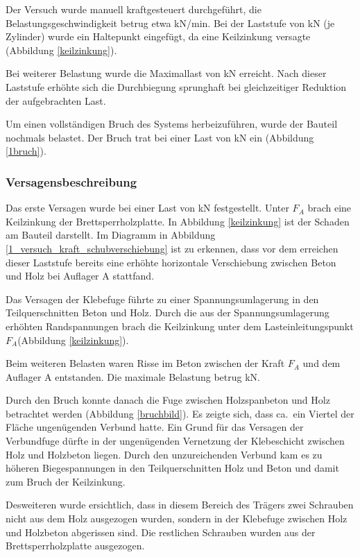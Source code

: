 Der Versuch wurde manuell kraftgesteuert durchgeführt, die Belastungsgeschwindigkeit betrug etwa \unit[4]{kN/min}. Bei der Laststufe von \unit[58]{kN} (je Zylinder) wurde ein Haltepunkt eingefügt, da eine Keilzinkung versagte (Abbildung \ref{keilzinkung}). 

Bei weiterer Belastung wurde die Maximallast von \unit[78]{kN} erreicht. Nach dieser Laststufe erhöhte sich die Durchbiegung sprunghaft bei gleichzeitiger Reduktion der aufgebrachten Last.

Um einen vollständigen Bruch des Systems herbeizuführen, wurde der Bauteil nochmals belastet. Der Bruch trat bei einer Last von \unit[48]{kN} ein (Abbildung \ref{1bruch}).

\subsubsection{Versagensbeschreibung}

Das erste Versagen wurde bei einer Last von \unit[58]{kN} festgestellt. Unter $F_{A}$ brach eine Keilzinkung der Brettsperrholzplatte. In Abbildung \ref{keilzinkung} ist der Schaden am Bauteil darstellt. Im Diagramm in Abbildung \ref{1_versuch_kraft_schubverschiebung} ist zu erkennen, dass vor dem erreichen dieser Laststufe bereits eine erhöhte horizontale Verschiebung zwischen Beton und Holz bei Auflager A stattfand. 

Das Versagen der Klebefuge führte zu einer Spannungsumlagerung in den Teilquerschnitten Beton und Holz. 
Durch die aus der Spannungsumlagerung erhöhten Randspannungen brach die Keilzinkung unter dem Lasteinleitungspunkt $F_{A}$(Abbildung \ref{keilzinkung}).  
  
Beim weiteren Belasten waren Risse im Beton zwischen der Kraft $F_{A}$ und dem Auflager A entstanden. Die maximale Belastung betrug \unit[78]{kN}. 



Durch den Bruch konnte danach die Fuge zwischen Holzspanbeton und Holz betrachtet werden (Abbildung \ref{bruchbild}). Es zeigte sich, dass ca.\ ein Viertel der Fläche ungenügenden Verbund hatte. Ein Grund für das Versagen der Verbundfuge dürfte in der ungenügenden Vernetzung der Klebeschicht zwischen Holz und Holzbeton liegen. Durch den unzureichenden Verbund kam es zu höheren Biegespannungen in den Teilquerschnitten Holz und Beton und damit zum Bruch der Keilzinkung.

Desweiteren wurde ersichtlich, dass in diesem Bereich des Trägers zwei Schrauben nicht aus dem Holz ausgezogen wurden, sondern in der Klebefuge zwischen Holz und Holzbeton abgerissen sind. Die restlichen Schrauben wurden aus der Brettsperrholzplatte ausgezogen. 




